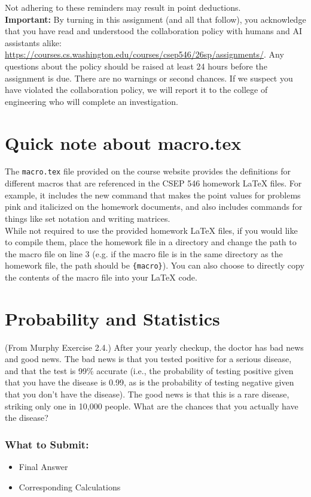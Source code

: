 \documentclass{article}
\begin{document}
Not adhering to these reminders may result in point deductions. \\

\textbf{Important:} By turning in this assignment (and all that follow), you acknowledge that you have read and understood the collaboration policy with humans and AI assistants alike: \url{https://courses.cs.washington.edu/courses/csep546/26sp/assignments/}. Any questions about the policy should be raised at least 24 hours before the assignment is due. There are no warnings or second chances. If we suspect you have violated the collaboration policy, we will report it to the college of engineering who will complete an investigation.





\section*{Quick note about macro.tex}
The \texttt{macro.tex} file provided on the course website provides the definitions for different macros that are referenced in the CSEP 546 homework \LaTeX{} files. For example, it includes the new command that makes the point values for problems pink and italicized on the homework documents, and also includes commands for things like set notation and writing matrices.\\

While not required to use the provided homework \LaTeX{} files, if you would like to compile them, place the homework file in a directory and change the path to the macro file on line 3 (e.g. if the macro file is in the same directory as the homework file, the path should be \verb_{macro}_). You can also choose to directly copy the contents of the macro file into your \LaTeX{} code.
\clearpage{}

\section*{Probability and Statistics}
\begin{aprob}
     (From Murphy Exercise 2.4.) 
    After your yearly checkup, the doctor has bad news and good news. 
    The bad news is that you tested positive for a serious disease, and that the test is 99\% accurate (i.e., the probability of testing positive given that you have the disease is 0.99, as is the probability of testing negative given that you don't have the disease).
    The good news is that this is a rare disease, striking only one in 10,000 people.
    What are the chances that you actually have the disease?
    
    \subsubsection*{What to Submit:}
    \begin{itemize}
        \item Final Answer
        \item Corresponding Calculations
    \end{itemize}
\end{aprob}
\end{document}
